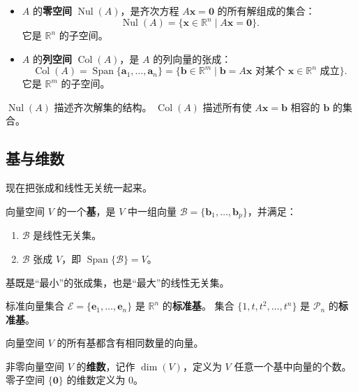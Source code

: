 \begin{definition}
\begin{itemize}
    \item $A$ 的\textbf{零空间} $\operatorname{Nul}(A)$，是齐次方程 $A\mathbf{x}=\mathbf{0}$ 的所有解组成的集合：
    \[ \operatorname{Nul}(A)=\{\mathbf{x}\in\mathbb{R}^n\mid A\mathbf{x}=\mathbf{0}\}. \]
    它是 $\mathbb{R}^n$ 的子空间。
    \item $A$ 的\textbf{列空间} $\operatorname{Col}(A)$，是 $A$ 的列向量的张成：
    \[ \operatorname{Col}(A)=\operatorname{Span}\{\mathbf{a}_1,\ldots,\mathbf{a}_n\}=\{\mathbf{b}\in\mathbb{R}^m\mid \mathbf{b}=A\mathbf{x}\text{ 对某个 }\mathbf{x}\in\mathbb{R}^n\text{ 成立}\}. \]
    它是 $\mathbb{R}^m$ 的子空间。
\end{itemize}
\end{definition}

$\operatorname{Nul}(A)$ 描述齐次解集的结构。
$\operatorname{Col}(A)$ 描述所有使 $A\mathbf{x}=\mathbf{b}$ 相容的 $\mathbf{b}$ 的集合。

\subsection{基与维数}
现在把张成和线性无关统一起来。

\begin{definition}
向量空间 $V$ 的一个\textbf{基}，是 $V$ 中一组向量 $\mathcal{B}=\{\mathbf{b}_1,\ldots,\mathbf{b}_p\}$，并满足：
\begin{enumerate}
    \item $\mathcal{B}$ 是线性无关集。
    \item $\mathcal{B}$ 张成 $V$，即 $\operatorname{Span}\{\mathcal{B}\}=V$。
\end{enumerate}
\end{definition}
基既是“最小”的张成集，也是“最大”的线性无关集。

\begin{example}
标准向量集合 $\mathcal{E}=\{\mathbf{e}_1,\ldots,\mathbf{e}_n\}$ 是 $\mathbb{R}^n$ 的\textbf{标准基}。
集合 $\{1,t,t^2,\ldots,t^n\}$ 是 $\mathcal{P}_n$ 的\textbf{标准基}。
\end{example}

\begin{theorem}
向量空间 $V$ 的所有基都含有相同数量的向量。
\end{theorem}

\begin{definition}
非零向量空间 $V$ 的\textbf{维数}，记作 $\dim(V)$，定义为 $V$ 任意一个基中向量的个数。零子空间 $\{\mathbf{0}\}$ 的维数定义为 $0$。
\end{definition}

